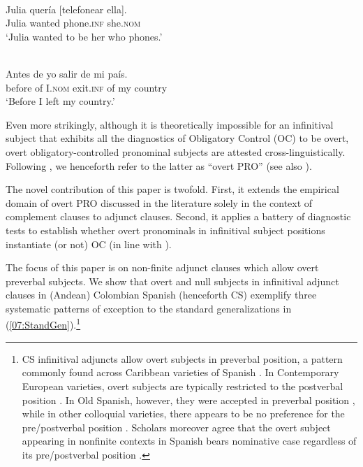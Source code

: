 \documentclass[output=paper,colorlinks,citecolor=brown,draft,draftmode]{langscibook}
\begin{document}
\begin{exe}
\ex \label{07:sp2}
 \\
\gll Julia quería [telefonear ella]. \\
Julia wanted phone.\textsc{inf} she.\textsc{nom} \\
\glt ‘Julia wanted to be her who phones.’

\ex \label{07:sp3}
 \\
\gll Antes de yo salir de mi país. \\
before of I.\textsc{nom} exit.\textsc{inf} of my country \\
\glt ‘Before I left my country.’
\end{exe}

Even more strikingly, although it is theoretically impossible for an infinitival subject that exhibits all the diagnostics of Obligatory Control (OC) to be overt, overt obligatory-controlled pronominal subjects are attested cross-linguistically. Following \citet{livitz11}, we henceforth refer to the latter as ``overt PRO'' (see also \citealt{szabolcsi09}).

The novel contribution of this paper is twofold. First, it extends the empirical domain of overt PRO discussed in the literature solely in the context of complement clauses to adjunct clauses. Second, it applies a battery of diagnostic tests to establish whether overt pronominals in infinitival subject positions instantiate (or not) OC (in line with \citealt{duguine13}).

The focus of this paper is on non-finite adjunct clauses which allow overt preverbal subjects. We show that overt and null subjects in infinitival adjunct clauses in (Andean) Colombian Spanish (henceforth CS) exemplify three systematic patterns of exception to the standard generalizations in (\ref{07:StandGen}).\footnote{CS infinitival adjuncts allow overt subjects in preverbal position, a pattern commonly found across Caribbean varieties of Spanish \citep{suner86, dauphinais&ortiz-lopez16, gonzalez20}. In Contemporary European varieties, overt subjects are typically restricted to the postverbal position \citep{RAEandASALE09}. In Old Spanish, however, they were accepted in preverbal position \citep{mensching00, corbalan18}, while in other colloquial varieties, there appears to be no preference for the pre/postverbal position \citep{mensching00, gallego10, herbeck11}. Scholars moreover agree that the overt subject appearing in nonfinite contexts in Spanish  bears nominative case regardless of its pre/postverbal position \citep{piera87, schütze97, mensching00}.}
\end{document}

